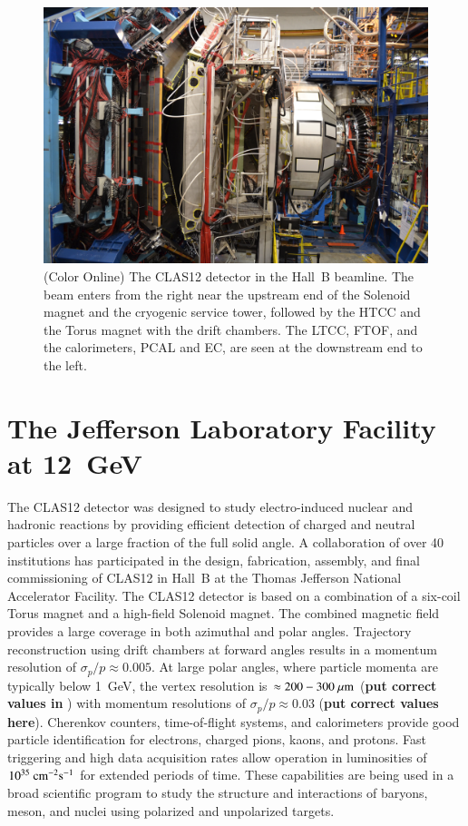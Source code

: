 \documentclass[final,3p,twocolumn]{elsarticle}
\begin{document}
\begin{figure}[bhtp!]
\centerline{\includegraphics[width=1.4\columnwidth]{CLAS12_photo-1.jpg}}
\caption{(Color Online) The CLAS12 detector in the Hall~B beamline. The beam enters from the right near the upstream end of the
Solenoid magnet and the cryogenic service tower, followed by the HTCC and the Torus magnet with the drift chambers.
The LTCC, FTOF, and the calorimeters, PCAL and EC, are seen at the downstream end to the left.}
\label{clas12-photo}
\end{figure}
\section{The Jefferson Laboratory Facility at 12~GeV}
\label{jlab}

The CLAS12 detector was designed to study electro-induced nuclear and hadronic reactions by providing efficient
detection of charged and neutral particles over a large fraction of the full solid angle. A collaboration of over 40
institutions has participated in the design, fabrication, assembly, and final commissioning of CLAS12 in Hall~B at the
Thomas Jefferson  National Accelerator Facility. The CLAS12 detector is based on a combination of a six-coil Torus
magnet and a high-field Solenoid magnet. The combined magnetic field provides a large coverage in both azimuthal and
polar angles. Trajectory reconstruction using drift chambers at forward angles results in a momentum resolution of
${\sigma_p / p} \approx 0.005$. At large polar angles, where particle momenta are typically below 1~GeV, the vertex
resolution is $\approx 200-300~\mu\rm{m}$ ({\bf put correct values in} ) with momentum resolutions of
$\sigma_p / p \approx 0.03$  ({\bf put correct values here}).  Cherenkov counters, time-of-flight systems, and
calorimeters provide good particle identification for electrons, charged pions, kaons, and protons. Fast triggering and
high data acquisition rates allow operation in luminosities of $10^{35}~\rm{cm}^{-2}\rm{s}^{-1}$ for extended periods of
time. These capabilities are being used in a broad scientific program to study the structure and interactions of baryons,
meson, and nuclei using polarized and unpolarized targets. 
\end{document}
